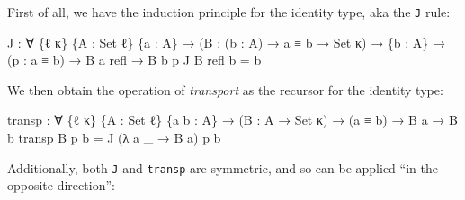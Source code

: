 \documentclass[
  12pt]{article}
\newenvironment{Shaded}{\begin{snugshade}}{\end{snugshade}}
\newcommand{\DataTypeTok}[1]{\textcolor[rgb]{0.00,0.34,0.68}{#1}}
\newcommand{\NormalTok}[1]{\textcolor[rgb]{0.12,0.11,0.11}{#1}}
\newcommand{\OtherTok}[1]{\textcolor[rgb]{0.00,0.43,0.16}{#1}}
\begin{document}
First of all, we have the induction principle for the identity type, aka
the \texttt{J} rule:

\begin{Shaded}
\begin{Highlighting}[]
\NormalTok{    J }\OtherTok{:} \OtherTok{∀} \OtherTok{\{}\NormalTok{ℓ κ}\OtherTok{\}} \OtherTok{\{}\NormalTok{A }\OtherTok{:} \DataTypeTok{Set}\NormalTok{ ℓ}\OtherTok{\}} \OtherTok{\{}\NormalTok{a }\OtherTok{:}\NormalTok{ A}\OtherTok{\}}
        \OtherTok{→} \OtherTok{(}\NormalTok{B }\OtherTok{:} \OtherTok{(}\NormalTok{b }\OtherTok{:}\NormalTok{ A}\OtherTok{)} \OtherTok{→}\NormalTok{ a ≡ b }\OtherTok{→} \DataTypeTok{Set}\NormalTok{ κ}\OtherTok{)}
        \OtherTok{→} \OtherTok{\{}\NormalTok{b }\OtherTok{:}\NormalTok{ A}\OtherTok{\}} \OtherTok{→} \OtherTok{(}\NormalTok{p }\OtherTok{:}\NormalTok{ a ≡ b}\OtherTok{)} \OtherTok{→}\NormalTok{ B a refl }\OtherTok{→}\NormalTok{ B b p}
\NormalTok{    J B refl b }\OtherTok{=}\NormalTok{ b}
\end{Highlighting}
\end{Shaded}

We then obtain the operation of \emph{transport} as the recursor for the
identity type:

\begin{Shaded}
\begin{Highlighting}[]
\NormalTok{    transp }\OtherTok{:} \OtherTok{∀} \OtherTok{\{}\NormalTok{ℓ κ}\OtherTok{\}} \OtherTok{\{}\NormalTok{A }\OtherTok{:} \DataTypeTok{Set}\NormalTok{ ℓ}\OtherTok{\}} \OtherTok{\{}\NormalTok{a b }\OtherTok{:}\NormalTok{ A}\OtherTok{\}} 
             \OtherTok{→} \OtherTok{(}\NormalTok{B }\OtherTok{:}\NormalTok{ A }\OtherTok{→} \DataTypeTok{Set}\NormalTok{ κ}\OtherTok{)} \OtherTok{→} \OtherTok{(}\NormalTok{a ≡ b}\OtherTok{)} \OtherTok{→}\NormalTok{ B a }\OtherTok{→}\NormalTok{ B b}
\NormalTok{    transp B p b }\OtherTok{=}\NormalTok{ J }\OtherTok{(λ}\NormalTok{ a }\OtherTok{\_} \OtherTok{→}\NormalTok{ B a}\OtherTok{)}\NormalTok{ p b}
\end{Highlighting}
\end{Shaded}

Additionally, both \texttt{J} and \texttt{transp} are symmetric, and so
can be applied ``in the opposite direction'':
\end{document}
